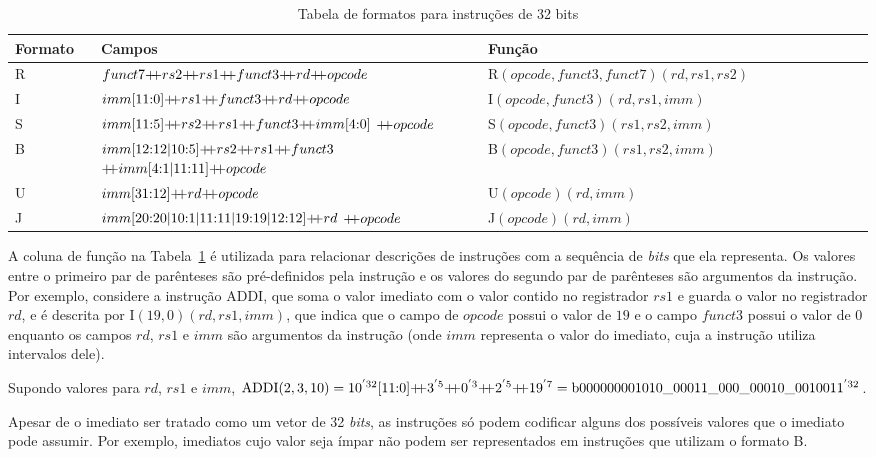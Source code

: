   \begin{table}
    \begin{tabular}{ |p{0.1\linewidth}|p{0.45\linewidth}|p{0.45\linewidth}| } 
      \hline
      Formato & Campos & Função \\ \hline \hline
      R & $funct7 \mdp rs2 \mdp rs1 \mdp funct3 \mdp rd \mdp opcode$ & R$(opcode, funct3, funct7)(rd, rs1, rs2)$ \\ \hline
      I & $imm[11\text{:}0] \mdp rs1 \mdp funct3 \mdp rd \mdp opcode$ & I$(opcode, funct3)(rd, rs1, imm)$ \\ \hline
      S & $imm[11\text{:}5] \mdp rs2 \mdp rs1 \mdp funct3 \mdp imm[4\text{:}0]$ ${+\!\!+} opcode$ & S$(opcode, funct3)(rs1, rs2, imm)$ \\ \hline
      B & $imm[12\text{:}12|10\text{:}5] {+\!\!+} rs2 {+\!\!+} rs1 {+\!\!+} funct3 $ $ {+\!\!+} imm[4\text{:}1|11\text{:}11] {+\!\!+} opcode$ & B$(opcode, funct3)(rs1, rs2, imm)$ \\ \hline
      U & $imm[31\text{:}12] {+\!\!+} rd {+\!\!+} opcode$ & U$(opcode)(rd, imm)$ \\ \hline
      J & $imm[20\text{:}20|10\text{:}1|11\text{:}11|19\text{:}19|12\text{:}12] {+\!\!+} rd $ $ {+\!\!+} opcode$ & J$(opcode)(rd, imm)$ \\ \hline 
    \end{tabular}
  \caption{Tabela de formatos para instruções de 32 bits\label{tab:if32f}}
  \end{table}

  A coluna de função na Tabela~\ref{tab:if32f} é utilizada para relacionar descrições de instruções com a 
  sequência de \emph{bits} que ela representa. Os valores entre o primeiro par de parênteses são pré-definidos 
  pela instrução e os valores do segundo par de parênteses são argumentos da instrução. Por exemplo, considere 
  a instrução ADDI, que soma o valor imediato com o valor contido no registrador $rs1$ e guarda o valor no 
  registrador $rd$, e é descrita por I$(19,0)(rd, rs1, imm)$, que indica que o campo de $opcode$ possui o 
  valor de $19$ e o campo $funct3$ possui o valor de $0$ enquanto os campos $rd$, $rs1$ e $imm$ são argumentos 
  da instrução (onde $imm$ representa o valor do imediato, cuja a instrução utiliza intervalos dele).

  Supondo valores para $rd$, $rs1$ e $imm$, $\text{ADDI}(2, 3, 10) = 
  10^{'32}[11\text{:}0]  \mdp  3^{'5}  \mdp  0^{'3}  \mdp  2^{'5}  \mdp  19^{'7} = \text{b}000000001010\_00011\_000\_00010\_0010011^{'32}$.

  Apesar de o imediato ser tratado como um vetor de 32 \emph{bits}, as instruções só podem codificar 
  alguns dos possíveis valores que o imediato pode assumir. Por exemplo, imediatos cujo valor seja ímpar não 
  podem ser representados em instruções que utilizam o formato B.

